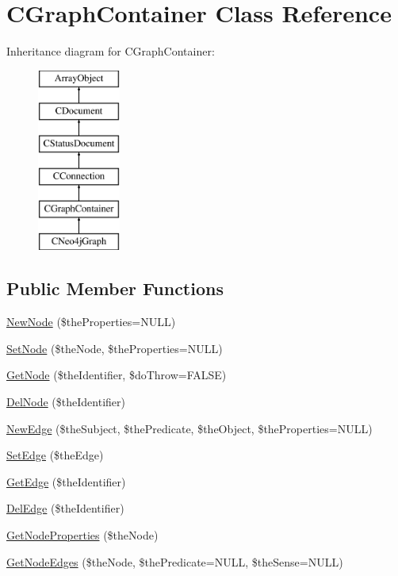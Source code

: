 \hypertarget{class_c_graph_container}{\section{C\-Graph\-Container Class Reference}
\label{class_c_graph_container}
}
Inheritance diagram for C\-Graph\-Container\-:\begin{figure}[H]
\begin{center}
\leavevmode
\includegraphics[height=6.000000cm]{class_c_graph_container}
\end{center}
\end{figure}
\subsection*{Public Member Functions}
\begin{DoxyCompactItemize}
\item 
\hyperlink{class_c_graph_container_a59ff4c421da0b86a984c1cf7f81ed50c}{New\-Node} (\$the\-Properties=N\-U\-L\-L)
\item 
\hyperlink{class_c_graph_container_a6bcbff95d7d44d5d59cb479ad0b94db9}{Set\-Node} (\$the\-Node, \$the\-Properties=N\-U\-L\-L)
\item 
\hyperlink{class_c_graph_container_a5ec59fc306eb927f4c1c7c1368d4bc2c}{Get\-Node} (\$the\-Identifier, \$do\-Throw=F\-A\-L\-S\-E)
\item 
\hyperlink{class_c_graph_container_a782de8f208c307af33786f8dc99f9593}{Del\-Node} (\$the\-Identifier)
\item 
\hyperlink{class_c_graph_container_a066acd7a5b35dffeca98610a75866aa4}{New\-Edge} (\$the\-Subject, \$the\-Predicate, \$the\-Object, \$the\-Properties=N\-U\-L\-L)
\item 
\hyperlink{class_c_graph_container_a536acefb01286cc1ccbc211f39179183}{Set\-Edge} (\$the\-Edge)
\item 
\hyperlink{class_c_graph_container_a78ad525680cd1c32e3c52cac29a8fe6a}{Get\-Edge} (\$the\-Identifier)
\item 
\hyperlink{class_c_graph_container_a54ce16d08b2709625069628171d2a6a5}{Del\-Edge} (\$the\-Identifier)
\item 
\hyperlink{class_c_graph_container_a040c1f90e349d61bb8b215ff55afe467}{Get\-Node\-Properties} (\$the\-Node)
\item 
\hyperlink{class_c_graph_container_a1980fc8e492c8f436eb9282f72dc2226}{Get\-Node\-Edges} (\$the\-Node, \$the\-Predicate=N\-U\-L\-L, \$the\-Sense=N\-U\-L\-L)
\end{DoxyCompactItemize}
